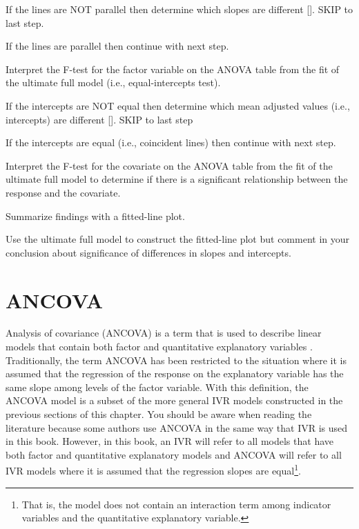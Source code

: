 \documentclass[10pt,openany]{book}\usepackage[]{graphicx}\usepackage[]{color}
\begin{document}
\begin{Enumerate}
    \begin{Itemize}
      \item If the lines are NOT parallel then determine which slopes are different [].  SKIP to last step.
      \item If the lines are parallel then continue with next step.
    \end{Itemize}
  \item Interpret the F-test for the factor variable on the ANOVA table from the fit of the ultimate full model (i.e., equal-intercepts test).
    \begin{Itemize}
      \item If the intercepts are NOT equal then determine which mean adjusted values (i.e., intercepts) are different [].  SKIP to last step
      \item If the intercepts are equal (i.e., coincident lines) then continue with next step.
    \end{Itemize}
  \item Interpret the F-test for the covariate on the ANOVA table from the fit of the ultimate full model to determine if there is a significant relationship between the response and the covariate.
  \item Summarize findings with a fitted-line plot.
    \begin{Itemize}
      \item Use the ultimate full model to construct the fitted-line plot but comment in your conclusion about significance of differences in slopes and intercepts.
    \end{Itemize}
\end{Enumerate}



\section{ANCOVA}
Analysis of covariance (ANCOVA) is a term that is used to describe linear models that contain both factor and quantitative explanatory variables \citep{Fox1997}.  Traditionally, the term ANCOVA has been restricted to the situation where it is assumed that the regression of the response on the explanatory variable has the same slope among levels of the factor variable.  With this definition, the ANCOVA model is a subset of the more general IVR models constructed in the previous sections of this chapter.  You should be aware when reading the literature because some authors use ANCOVA in the same way that IVR is used in this book.  However, in this book, an IVR will refer to all models that have both factor and quantitative explanatory models and ANCOVA will refer to all IVR models where it is assumed that the regression slopes are equal\footnote{That is, the model does not contain an interaction term among indicator variables and the quantitative explanatory variable.}.
\end{document}
